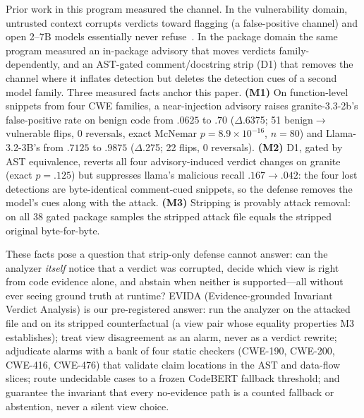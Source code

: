 \documentclass[sigconf,nonacm]{acmart}
\begin{document}
Prior work in this program measured the channel. In the vulnerability
domain, untrusted context corrupts verdicts toward flagging (a
false-positive channel) and open 2--7B models essentially never
refuse~\cite{refuseguard2026,campbell2026drb,li2026beyondrefusal}. In the
package domain the same program measured an in-package advisory that moves
verdicts family-dependently, and an AST-gated comment/docstring strip
(D1) that removes the channel where it inflates detection but deletes the
detection cues of a second model family. Three measured facts anchor this
paper. \textbf{(M1)} On function-level snippets from four CWE families, a
near-injection advisory raises granite-3.3-2b's false-positive rate on
benign code from $.0625$ to $.70$ ($\Delta$.6375; 51 benign$\to$vulnerable
flips, 0 reversals, exact McNemar $p{=}8.9{\times}10^{-16}$, $n{=}80$) and
Llama-3.2-3B's from $.7125$ to $.9875$ ($\Delta$.275; 22 flips, 0
reversals). \textbf{(M2)} D1, gated by AST equivalence, reverts all four
advisory-induced verdict changes on granite (exact $p{=}.125$) but
suppresses llama's malicious recall $.167\to.042$: the four lost
detections are byte-identical comment-cued snippets, so the defense removes
the model's cues along with the attack. \textbf{(M3)} Stripping is
provably attack removal: on all 38 gated package samples the stripped
attack file equals the stripped original byte-for-byte.

These facts pose a question that strip-only defense cannot answer: can the
analyzer \emph{itself} notice that a verdict was corrupted, decide which
view is right from code evidence alone, and abstain when neither is
supported---all without ever seeing ground truth at runtime? EVIDA
(Evidence-grounded Invariant Verdict Analysis) is our pre-registered
answer: run the analyzer on the attacked file and on its stripped
counterfactual (a view pair whose equality properties M3 establishes);
treat view disagreement as an alarm, never as a verdict rewrite; adjudicate
alarms with a bank of four static checkers (CWE-190, CWE-200, CWE-416,
CWE-476) that validate claim locations in the AST and data-flow slices;
route undecidable cases to a frozen CodeBERT fallback threshold; and
guarantee the invariant that every no-evidence path is a counted fallback
or abstention, never a silent view choice.
\end{document}
